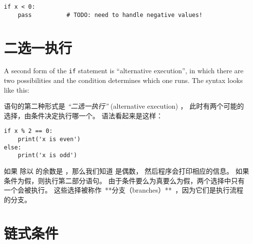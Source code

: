 {{{{\begin{lstlisting}
if x < 0:
    pass          # TODO: need to handle negative values!
\end{lstlisting}
%

\section{二选一执行}
\label{alternative.execution}
    

A second form of the {\tt if} statement is ``alternative execution'',
in which there are two possibilities and the condition determines
which one runs.  The syntax looks like this:

 语句的第二种形式是 {\em ``二选一执行''} (alternative execution) ，
此时有两个可能的选择，由条件决定执行哪一个。 语法看起来是这样：


\begin{lstlisting}
if x % 2 == 0:
    print('x is even')
else:
    print('x is odd')
\end{lstlisting}

%

如果  除以  的余数是 ，那么我们知道  是偶数，
然后程序会打印相应的信息。 如果条件为假，则执行第二部分语句。
由于条件要么为真要么为假，两个选择中只有一个会被执行。
这些选择被称作\ **分支（branches）**\ ，因为它们是执行流程的分支。

  


\section{链式条件}

}}}}
